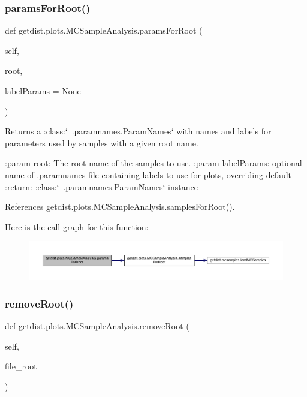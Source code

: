 \subsubsection{\texorpdfstring{params\+For\+Root()}{paramsForRoot()}}
{\footnotesize\ttfamily def getdist.\+plots.\+M\+C\+Sample\+Analysis.\+params\+For\+Root (\begin{DoxyParamCaption}\item[{}]{self,  }\item[{}]{root,  }\item[{}]{label\+Params = {\ttfamily None} }\end{DoxyParamCaption})}

\begin{DoxyVerb}Returns a :class:`~.paramnames.ParamNames` with names and labels for parameters used by samples with a given root name.

:param root: The root name of the samples to use.
:param labelParams: optional name of .paramnames file containing labels to use for plots, overriding default
:return: :class:`~.paramnames.ParamNames` instance
\end{DoxyVerb}
 

References getdist.\+plots.\+M\+C\+Sample\+Analysis.\+samples\+For\+Root().

Here is the call graph for this function\+:
\nopagebreak
\begin{figure}[H]
\begin{center}
\leavevmode
\includegraphics[width=350pt]{classgetdist_1_1plots_1_1MCSampleAnalysis_ad38551dc8499923e02dd925ab2a0e6cf_cgraph}
\end{center}
\end{figure}
\mbox{\label{classgetdist_1_1plots_1_1MCSampleAnalysis_aed1d592770a9f8dbd55af844bb55234e}} 
\subsubsection{\texorpdfstring{remove\+Root()}{removeRoot()}}
{\footnotesize\ttfamily def getdist.\+plots.\+M\+C\+Sample\+Analysis.\+remove\+Root (\begin{DoxyParamCaption}\item[{}]{self,  }\item[{}]{file\+\_\+root }\end{DoxyParamCaption})}


